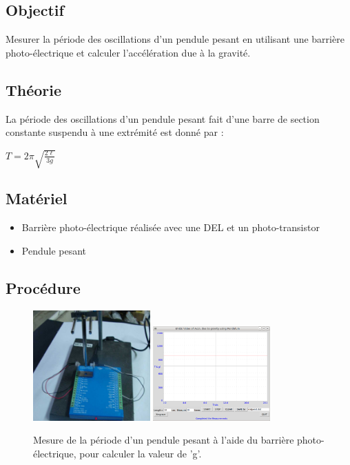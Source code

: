 \documentclass{book}
\begin{document}
\subsection{Objectif}


Mesurer la période des oscillations d'un pendule pesant en utilisant une barrière photo-électrique et calculer l'accélération due à la gravité.

\subsection{Théorie}


La période des oscillations d'un pendule pesant fait d'une barre de section constante suspendu à une extrémité est donné par :



$T=2\pi\sqrt{\frac{2\ell}{3g} }$

\subsection{Matériel}


\begin{itemize}
  \item Barrière photo-électrique réalisée avec une DEL et un photo-transistor
  \item Pendule pesant
\end{itemize}

\subsection{Procédure}


\begin{figure}[h!]
\begin{center}
\caption{\label{fig:Rod-Pendulum}Mesure de la période d'un pendule pesant à l'aide du barrière photo-électrique, pour calculer la valeur de 'g'. }\vspace{0.5em}
\includegraphics[width=0.4\textwidth, height=0.3\textwidth, keepaspectratio]{Schematic-rodpend-photo.png}
\includegraphics[width=0.4\textwidth, height=0.3\textwidth, keepaspectratio]{Pic-rodpend-screen.png}
\end{center}
\end{figure}
\end{document}
